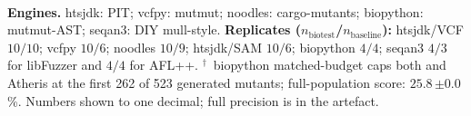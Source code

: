 \begin{table}[!htbp]
{\begin{tabular}{l c c c c c c}
\bottomrule
\end{tabular}}
\\[0.1em]
{\scriptsize
\textbf{Engines.} htsjdk: PIT;
vcfpy: mutmut;
noodles: cargo-mutants;
biopython: mutmut-AST;
seqan3: DIY mull-style.
\textbf{Replicates ($n_{\text{biotest}}$/$n_{\text{baseline}}$):}
htsjdk/VCF $10/10$; vcfpy $10/6$; noodles $10/9$; htsjdk/SAM
$10/6$; biopython $4/4$; seqan3 $4/3$ for libFuzzer and $4/4$
for AFL++.
$^{\dagger}$~biopython matched-budget caps both \biotest{} and
Atheris at the first 262 of 523 generated mutants;
full-population \biotest{} score: $25.8\,${\tiny$\pm 0.0$}\%.
Numbers shown to one decimal; full precision is in the artefact.}
\end{table}
